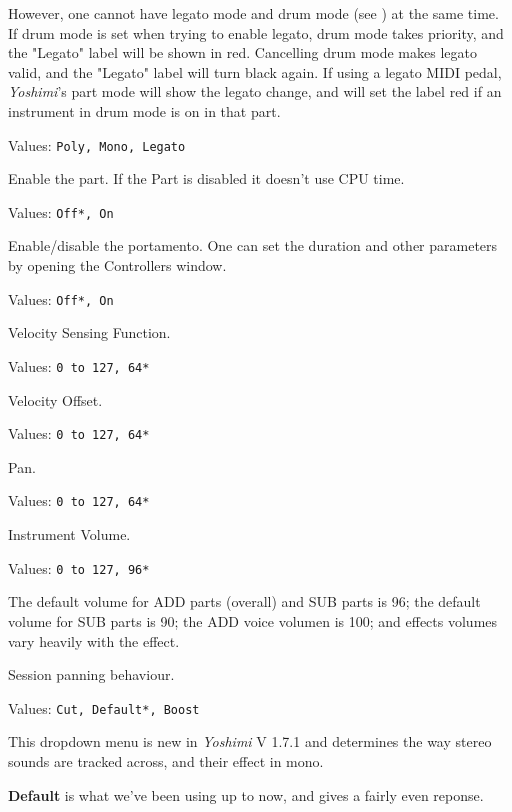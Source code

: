 	However, one cannot have legato mode and drum mode
	(see )
   at the same time.
   If drum mode is set when trying to enable legato,
   drum mode takes priority, and the "Legato" label will be shown in red.
   Cancelling drum mode makes legato valid, and the "Legato" label
   will turn black again.
   If using a legato MIDI pedal, \textsl{Yoshimi}'s part mode will show
   the legato change, and will set the label red if an instrument in drum mode
   is on in that part.

   Values: \texttt{Poly, Mono, Legato}

   Enable the part. If the Part is disabled it doesn't use CPU time.

   Values: \texttt{Off*, On}

   Enable/disable the portamento.
   One can set the duration and other parameters by opening the Controllers
   window.

   Values: \texttt{Off*, On}

   Velocity Sensing Function.

   Values: \texttt{0 to 127, 64*}

   Velocity Offset.

   Values: \texttt{0 to 127, 64*}

   Pan.

   Values: \texttt{0 to 127, 64*}

   Instrument Volume.

   Values: \texttt{0 to 127, 96*}

   The default volume for ADD parts (overall) and SUB parts is 96; the
   default volume for SUB parts is 90; the ADD voice volumen is 100; and
   effects volumes vary heavily with the effect.

   Session panning behaviour.

   Values: \texttt{Cut, Default*, Boost}

   This dropdown menu is new in \textsl{Yoshimi} V 1.7.1 and determines the way
   stereo sounds are tracked across, and their effect in mono.

   \textbf{Default} is what we've been using up to now, and gives a fairly even
   reponse.

